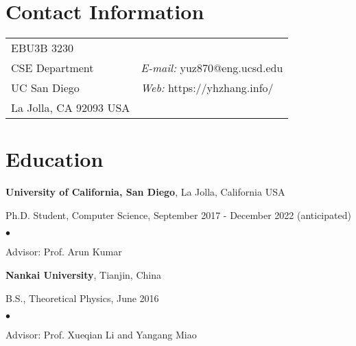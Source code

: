 \documentclass[margin,line]{res}
\newenvironment{list1}{
 \begin{list}{\ding{113}}{%
   \setlength{\itemsep}{0in}
   \setlength{\parsep}{0in} \setlength{\parskip}{0in}
   \setlength{\topsep}{0in} \setlength{\partopsep}{0in} 
   \setlength{\leftmargin}{0.17in}}}{\end{list}}
\newenvironment{list2}{
 \begin{list}{$\bullet$}{%
   \setlength{\itemsep}{0in}
   \setlength{\parsep}{0in} \setlength{\parskip}{0in}
   \setlength{\topsep}{0in} \setlength{\partopsep}{0in} 
   \setlength{\leftmargin}{0.2in}}}{\end{list}}
\begin{document}
\sloppy


\begin{resume}
\section{\sc Contact Information}
\vspace{.05in}
\begin{tabular}{@{}p{2in}p{4in}}
EBU3B 3230       &  \\       
CSE Department  & {\it E-mail:} yuz870@eng.ucsd.edu\\
UC San Diego & {\it Web:} https://yhzhang.info/ \\    
La Jolla, CA 92093 USA & \\   
\end{tabular}

\section{\sc Education}
{\bf University of California, San Diego}, La Jolla, California USA\\
\vspace*{-.1in}
\begin{list1}
\item[] Ph.D. Student, Computer Science, September 2017 - December 2022 (anticipated)
\begin{list2}
\vspace*{.05in}
\item Advisor: Prof. Arun Kumar
\end{list2}
\end{list1}

{\bf Nankai University}, Tianjin, China\\
\vspace*{-.1in}
\begin{list1}
\item[] B.S., Theoretical Physics, June 2016
\begin{list2}
\item Advisor: Prof. Xueqian Li and Yangang Miao
\end{list2}
\end{list1}



\end{resume}
\end{document}
